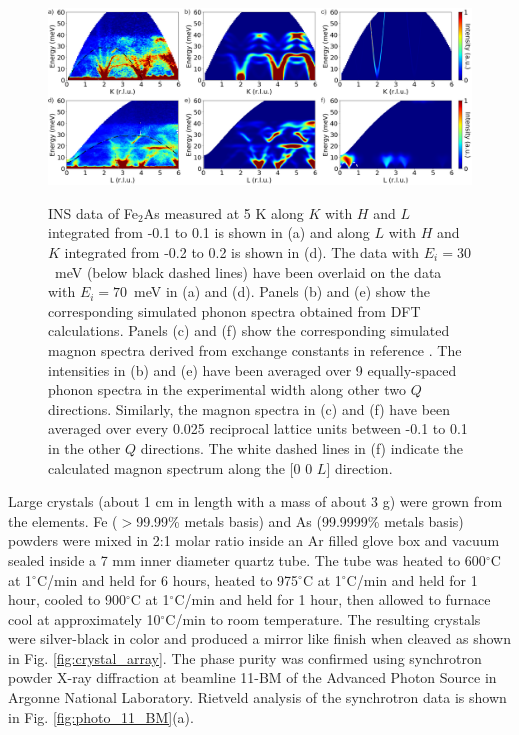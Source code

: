 \documentclass[10pt,doublespacing,edeposit]{uiucthesis2020}
\begin{document}
\begin{mainmatter}
\begin{figure}
\end{figure}


\begin{figure}
\centering\includegraphics[width=\columnwidth]{figures/ch8/phonon_spectra_magnon_spectra_combined.png} \\
\caption{\label{fig:phonon_magnon_spectra}
INS data of Fe$_2$As measured at 5 K along $K$ with $H$ and $L$ integrated from -0.1 to 0.1 is shown in (a) and along $L$ with $H$ and $K$ integrated from -0.2 to 0.2 is shown in (d). The data with $E_i = 30$~meV (below black dashed lines) have been overlaid on the data with $E_i = 70$~meV in (a) and (d). Panels (b) and (e) show the corresponding simulated phonon spectra obtained from DFT calculations. Panels (c) and (f) show the corresponding simulated magnon spectra derived from exchange constants in reference . The intensities in (b) and (e) have been averaged over 9 equally-spaced phonon spectra in the experimental width along other two $Q$ directions. Similarly, the magnon spectra in (c) and (f) have been averaged over every 0.025 reciprocal lattice units between -0.1 to 0.1 in the other $Q$ directions. The white dashed lines in (f) indicate the calculated magnon spectrum along the [0 0 $L$] direction.
}
\end{figure}


Large crystals (about 1 cm in length with a mass of about 3 g) were grown from the elements. 
Fe ($>$99.99\% metals basis) and As (99.9999\% metals basis) powders were mixed in 2:1 molar ratio inside an Ar filled glove box and vacuum sealed inside a 7 mm inner diameter quartz tube.
The tube was heated to 600$^{\circ}$C at 1$^{\circ}$C/min and held for 6 hours, heated to 975$^{\circ}$C at 1$^{\circ}$C/min and held for 1 hour, cooled to 900$^{\circ}$C at 1$^{\circ}$C/min and held for 1 hour, then allowed to furnace cool at approximately 10$^{\circ}$C/min to room temperature. The resulting crystals were silver-black in color and produced a mirror like finish when cleaved as shown in Fig. \ref{fig:crystal_array}. The phase purity  was confirmed using synchrotron powder X-ray diffraction  at beamline 11-BM of the Advanced Photon Source in Argonne National Laboratory. Rietveld analysis of the synchrotron data is shown in Fig. \ref{fig:photo_11_BM}(a).




\end{mainmatter}
\end{document}
